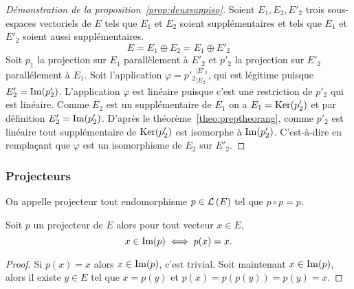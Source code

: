 \begin{proof}[Démonstration de la proposition~\ref{prop:deuxsuppiso}]
  Soient \(E_1, E_2, E'_2\) trois sous-espaces vectoriels de \(E\) tels que
  \(E_1\) et \(E_2\) soient supplémentaires et tels que \(E_1\) et \(E'_2\)
  soient aussi supplémentaires.
  \begin{equation}
    E=E_1 \oplus E_2 = E_1 \oplus E'_2
  \end{equation}
  Soit \(p_1\) la projection sur \(E_1\) parallèlement à \(E'_2\) et \(p'_2\) la
  projection sur \(E'_2\) parallélement à \(E_1\). Soit l'application
  \(\varphi={p'_2}_{|E_2}^{|E'_2}\), qui est légitime puisque
  \(E'_2=\operatorname{Im}(p'_2)\). L'application \(\varphi\) est linéaire puisque c'est
  une restriction de \(p'_2\) qui est linéaire. Comme \(E_2\) est un
  supplémentaire de \(E_1\) on a \(E_1 = \operatorname{Ker}(p'_2)\) et par définition \(E'_2 =
  \operatorname{Im}(p'_2)\). D'après le théorème~\ref{theo:preptheorang}, comme \(p'_2\) est linéaire tout supplémentaire de
  \(\operatorname{Ker}(p'_2)\) est isomorphe à \(\operatorname{Im}(p'_2)\). C'est-à-dire en remplaçant
  que \(\varphi\) est un isomorphisme de \(E_2\) sur \(E'_2\).
\end{proof}

\subsubsection{Projecteurs}

\begin{defdef}
  On appelle projecteur tout endomorphisme \(p \in \mathcal{L}\left(E\right)\) tel que \(p \circ
  p=p\).
\end{defdef}

\begin{prop}\label{prop:caracimageproj}
  Soit \(p\) un projecteur de \(E\) alors pour tout vecteur \(x \in E\),
  \begin{equation}
    x \in \operatorname{Im}(p) \iff p(x)=x.
  \end{equation}
\end{prop}
\begin{proof}
  Si \(p(x)=x\) alors \(x \in \operatorname{Im}(p)\), c'est trivial. Soit maintenant \(x
  \in \operatorname{Im}(p)\), alors il existe \(y \in E\) tel que \(x=p(y)\) et
  \(p(x)=p(p(y))=p(y)=x\).
\end{proof}

